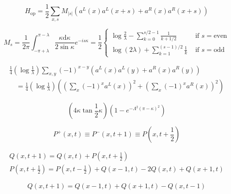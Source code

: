\documentclass[main.tex]{subfiles}
\begin{document}
\begin{equation}\label{17.33}
	H_{\mathrm{op}}=\frac{1}{2} \sum_{x, s} M_{|s|}\left(a^{L}(x) a^{L}(x+s)+a^{R}(x) a^{R}(x+s)\right)
\end{equation}



\begin{equation}\label{17.34}
	M_{s}=\frac{1}{2 \pi} \int_{-\pi+\lambda}^{\pi-\lambda} \frac{\kappa \mathrm{d} \kappa}{2 \sin \kappa} e^{-i s \kappa}=\frac{1}{2}\left\{\begin{array}{ll}{\log \frac{2}{\lambda}-\sum_{k=0}^{s / 2-1} \frac{1}{k+1 / 2}} & {\text { if } s=\mathrm{even}} \\ {\log (2 \lambda)+\sum_{k=1}^{(s-1) / 2} \frac{1}{k}} & {\text { if } s=\mathrm{odd}}\end{array}\right.
\end{equation}

\begin{equation}\label{17.35}
	\begin{array}{l}{\frac{1}{4}\left(\log \frac{1}{\lambda}\right) \sum_{x, y}(-1)^{x-y}\left(a^{L}(x) a^{L}(y)+a^{R}(x) a^{R}(y)\right)} \\ {\quad=\frac{1}{4}\left(\log \frac{1}{\lambda}\right)\left(\left(\sum_{x}(-1)^{x} a^{L}(x)\right)^{2}+\left(\sum_{x}(-1)^{x} a^{R}(x)\right)^{2}\right)}\end{array}
\end{equation}


\begin{equation}\label{17.36}
	\left(4 \kappa \tan \frac{1}{2} \kappa\right)\left(1-e^{-\Lambda^{2}(\pi-\kappa)^{2}}\right)
\end{equation}


\begin{equation}\label{17.37}
	P^{+}(x, t) \equiv P^{-}(x, t+1) \equiv P\left(x, t+\frac{1}{2}\right)
\end{equation}


\begin{equation}\label{17.38}
	\begin{array}{l}{Q(x, t+1)=Q(x, t)+P\left(x, t+\frac{1}{2}\right)} \\ {P\left(x, t+\frac{1}{2}\right)=P\left(x, t-\frac{1}{2}\right)+Q(x-1, t)-2 Q(x, t)+Q(x+1, t)}\end{array}
\end{equation}


\begin{equation}\label{17.40}
	Q(x, t+1)=Q(x-1, t)+Q(x+1, t)-Q(x, t-1)
\end{equation}
\end{document}
